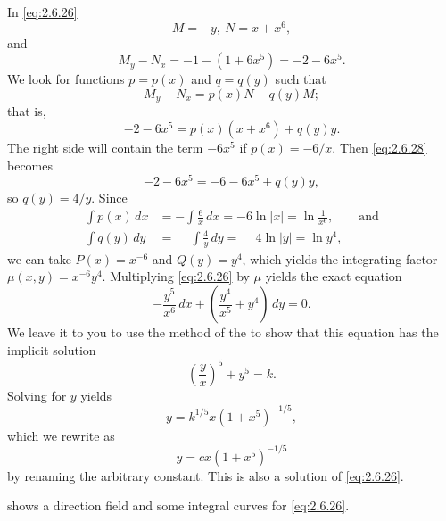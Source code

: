 \begin{solution}
In \eqref{eq:2.6.26}
\[
M=-y,\ N=x+x^6,
\]
and
\[
M_y-N_x=-1-(1+6x^5)=-2-6x^5.
\]
We  look for functions
$p=p(x)$ and $q=q(y)$ such that
\[
M_y-N_x=p(x)N-q(y)M;
\]
that is,
\begin{equation}\label{eq:2.6.28}
-2-6x^5=p(x)(x+x^6)+q(y)y.
\end{equation}
The right side will contain the term $-6x^5$ if $p(x)=-6/x$.   Then
\eqref{eq:2.6.28} becomes
\[
-2-6x^5=-6-6x^5+q(y)y,
\]
so  $q(y)=4/y$.  Since
\begin{align*}
\int p(x)\,dx&=-\int\frac{6}{x}\,dx=-6\ln|x|=\ln\frac{1}{x^6},
\qquad\text{and}\\
\int q(y)\,dy&=\phantom-\int\frac{4}{y}\,dy=\phantom-4\ln|y|=\ln{y^4},
\end{align*}
we can take $P(x)=x^{-6}$ and $Q(y)=y^4$,
which yields the integrating factor $\mu(x,y)=x^{-6}y^4$.
Multiplying \eqref{eq:2.6.26} by  $\mu$ yields the exact equation
\[
-\frac{y^5}{x^6}\,dx+\left(\frac{y^4}{x^5}+y^4\right)
\,dy=0.
\]
 We leave it to you to use the method of the 
to show that this equation has the implicit solution \[
\left(\frac{y}{x}\right)^5+y^5=k.
\]
 Solving for $y$ yields
\[
y=k^{1/5}x(1+x^5)^{-1/5},
\]
which we rewrite as
\[
y=cx(1+x^5)^{-1/5}
\]
by renaming the arbitrary constant.
 This is also a solution of \eqref{eq:2.6.26}.

 shows a direction field and some integral curves
 for \eqref{eq:2.6.26}.
\end{solution}

